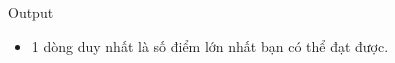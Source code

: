 Output
\begin{itemize}
	\item 1 dòng duy nhất là số điểm lớn nhất bạn có thể đạt được.
\end{itemize}